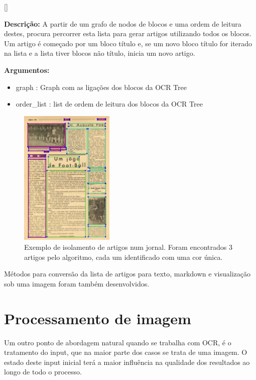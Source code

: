 [\normalsize]

\textbf{Descrição:} A partir de um grafo de nodos de blocos e uma ordem de leitura destes, procura percorrer esta lista para gerar artigos utilizando todos os blocos. Um artigo é começado por um bloco título e, se um novo bloco título for iterado na lista e a lista tiver blocos não título, inicia um novo artigo.

\textbf{Argumentos:}
\begin{itemize}\setlength\itemsep{-0.3em}
	\vspace{-0.5em}
	\item graph : Graph com as ligações dos blocos da OCR Tree
	\item order\_list : list de ordem de leitura dos blocos da OCR Tree
\end{itemize}


\begin{figure}[H]
	\centering
	\includegraphics[width=0.4\textwidth]{images/ilustracoes/extract_articles_example.png}
	\caption{Exemplo de isolamento de artigos num jornal. Foram encontrados 3 artigos pelo algoritmo, cada um identificado com uma cor única.}
	\label{fig:extract_articles_example}
\end{figure}

Métodos para conversão da lista de artigos para texto, markdown e visualização sob uma imagem foram também desenvolvidos.



\section{Processamento de imagem}
\label{contribution_image_processing}


Um outro ponto de abordagem natural quando se trabalha com OCR, é o tratamento do input, que na maior parte dos casos se trata de uma imagem. O estado deste input inicial terá a maior influência na qualidade dos resultados ao longo de todo o processo.

